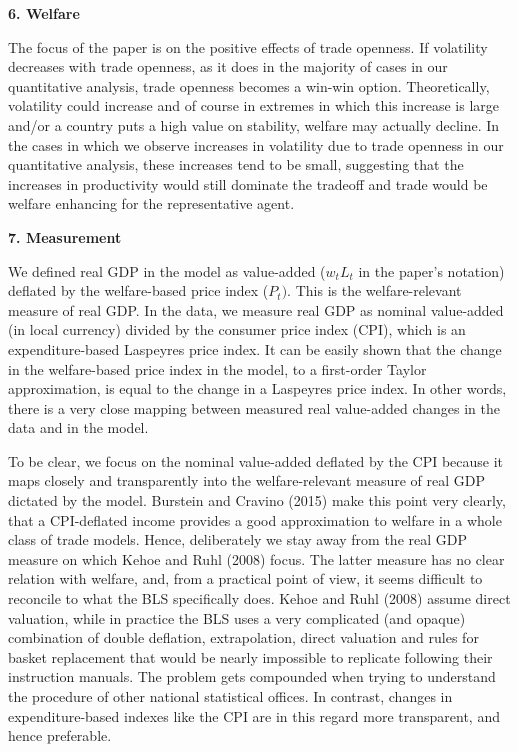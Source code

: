 \documentclass[12pt]{article}
\begin{document}
\textbf{6. Welfare}

The focus of the paper is on the positive effects of trade openness. If
volatility decreases with trade openness, as it does in the majority of
cases in our quantitative analysis, trade openness becomes a win-win option.
Theoretically, volatility could increase and of course in extremes in which
this increase is large and/or a country puts a high value on stability,
welfare may actually decline. In the cases in which we observe increases in
volatility due to trade openness in our quantitative analysis, these
increases tend to be small, suggesting that the increases in productivity
would still dominate the tradeoff and trade would be welfare enhancing for
the representative agent.\bigskip

\textbf{7. Measurement}

We defined real GDP in the model as value-added ($w_{t}L_{t}$ in the paper's
notation) deflated by the welfare-based price index ($P_{t})$. This is the
welfare-relevant measure of real GDP. In the data, we measure real GDP as
nominal value-added (in local currency) divided by the consumer price index
(CPI), which is an expenditure-based Laspeyres price index. It can be easily
shown that the change in the welfare-based price index in the model, to a
first-order Taylor approximation, is equal to the change in a Laspeyres
price index. In other words, there is a very close mapping between measured
real value-added changes in the data and in the model.

To be clear, we focus on the nominal value-added deflated by the CPI because
it maps closely and transparently into the welfare-relevant measure of real
GDP dictated by the model. Burstein and Cravino (2015) make this point very clearly, that a CPI-deflated income provides a good approximation to welfare in a whole class of trade models.
Hence, deliberately we stay away from the real
GDP measure on which Kehoe and Ruhl (2008) focus. The latter measure has no
clear relation with welfare, and, from a practical point of view, it seems difficult to reconcile to what the BLS specifically does. Kehoe and Ruhl (2008)
assume direct valuation, while in practice the BLS uses a very complicated
(and opaque) combination of double deflation, extrapolation, direct
valuation and rules for basket replacement that would be nearly impossible
to replicate following their instruction manuals. The problem gets
compounded when trying to understand the procedure of other national
statistical offices. In contrast, changes in expenditure-based indexes like
the CPI are in this regard more transparent, and hence preferable.
\end{document}
